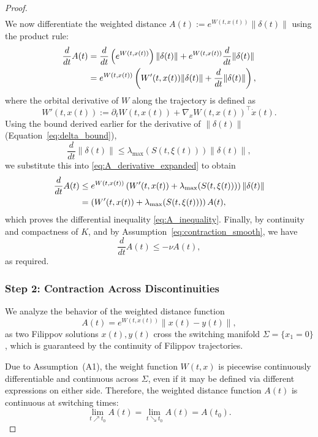 \documentclass[11pt]{article}
\begin{document}
\begin{proof}
\begin{align}
\end{align}
We now differentiate the weighted distance \( A(t) := e^{W(t,x(t))} \|\delta(t)\| \) using the product rule:
\begin{align}
	\frac{d}{dt} A(t) &= \frac{d}{dt} \left( e^{W(t,x(t))} \right) \|\delta(t)\| + e^{W(t,x(t))} \frac{d}{dt} \|\delta(t)\| \notag \\
	&= e^{W(t,x(t))} \left( W'(t,x(t)) \|\delta(t)\| + \frac{d}{dt} \|\delta(t)\| \right), \label{eq:A_derivative_expanded}
\end{align}
where the orbital derivative of \( W \) along the trajectory is defined as
\[
W'(t,x(t)) := \partial_t W(t,x(t)) + \nabla_x W(t,x(t))^\top \dot{x}(t).
\]
Using the bound derived earlier for the derivative of \( \|\delta(t)\| \) (Equation~\eqref{eq:delta_bound}),
\[
\frac{d}{dt} \|\delta(t)\| \leq \lambda_{\max}(S(t,\xi(t))) \|\delta(t)\|,
\]
we substitute this into \eqref{eq:A_derivative_expanded} to obtain
\begin{align}
	\frac{d}{dt} A(t) &\leq e^{W(t,x(t))} \left( W'(t,x(t)) + \lambda_{\max}(S(t,\xi(t))) \right) \|\delta(t)\| \notag \\
	&= \left( W'(t,x(t)) + \lambda_{\max}(S(t,\xi(t))) \right) A(t), \label{eq:A_inequality}
\end{align}
which proves the differential inequality \eqref{eq:A_inequality}. Finally, by continuity and compactness of $K$, and by Assumption~\eqref{eq:contraction_smooth}, we have
\begin{equation} \label{eq:final_decay}
	\frac{d}{dt} A(t) \leq -\nu A(t),
\end{equation}
as required.


\subsubsection*{Step 2: Contraction Across Discontinuities}

We analyze the behavior of the weighted distance function
\begin{equation} \label{eq:weighted_distance_definition}
	A(t) = e^{W(t,x(t))} \|x(t) - y(t)\|,
\end{equation}
as two Filippov solutions \( x(t), y(t) \) cross the switching manifold \( \Sigma = \{x_1 = 0\} \),
which is guaranteed by the continuity of Filippov trajectories. 

Due to Assumption~(A1), the weight function \( W(t,x) \) is piecewise continuously differentiable and continuous across \( \Sigma \), even if it may be defined via different expressions on either side. Therefore, the weighted distance function \( A(t) \) is continuous at switching times:
\begin{equation} \label{eq:continuity_switching}
	\lim_{t \nearrow t_0} A(t) = \lim_{t \searrow t_0} A(t) = A(t_0).
\end{equation}


\end{proof}
\end{document}
